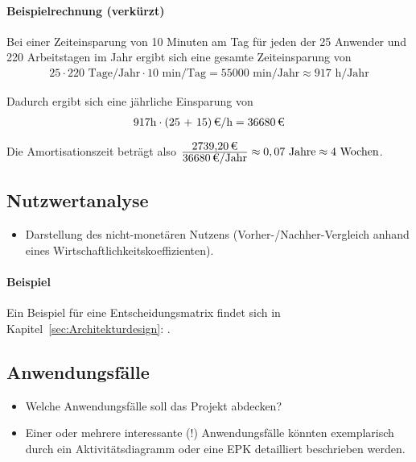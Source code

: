 \paragraph{Beispielrechnung (verkürzt)}
Bei einer Zeiteinsparung von 10 Minuten am Tag für jeden der 25 Anwender und 220 Arbeitstagen im Jahr ergibt sich eine gesamte Zeiteinsparung von 
\begin{eqnarray}
25 \cdot 220 \mbox{ Tage/Jahr} \cdot 10 \mbox{ min/Tag} = 55000 \mbox{ min/Jahr} \approx 917 \mbox{ h/Jahr} 
\end{eqnarray}

Dadurch ergibt sich eine jährliche Einsparung von 
\begin{eqnarray}
917 \mbox{h} \cdot \eur{(25 + 15)}{\mbox{/h}} = \eur{36680}
\end{eqnarray}

Die Amortisationszeit beträgt also $\frac{\eur{2739,20}}{\eur{36680}\mbox{/Jahr}} \approx 0,07 \mbox{ Jahre} \approx 4 \mbox{ Wochen}$.


\subsection{Nutzwertanalyse}
\label{sec:Nutzwertanalyse}
\begin{itemize}
	\item Darstellung des nicht-monetären Nutzens (\zB Vorher-/Nachher-Vergleich anhand eines Wirtschaftlichkeitskoeffizienten). 
\end{itemize}

\paragraph{Beispiel}
Ein Beispiel für eine Entscheidungsmatrix findet sich in Kapitel~\ref{sec:Architekturdesign}: .


\subsection{Anwendungsfälle}
\label{sec:Anwendungsfaelle}
\begin{itemize}
	\item Welche Anwendungsfälle soll das Projekt abdecken?
	\item Einer oder mehrere interessante (!) Anwendungsfälle könnten exemplarisch durch ein Aktivitätsdiagramm oder eine \ac{EPK} detailliert beschrieben werden. 
\end{itemize}

